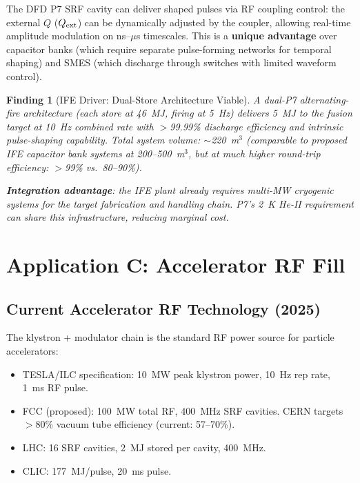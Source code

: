 \documentclass[11pt]{article}
\newtheorem{finding}{Finding}
\begin{document}
The DFD P7 SRF cavity can deliver shaped pulses via RF coupling control:
the external $Q$ ($Q_{\rm ext}$) can be dynamically adjusted by the
coupler, allowing real-time amplitude modulation on ns--$\mu$s timescales.
This is a \textbf{unique advantage} over capacitor banks (which require
separate pulse-forming networks for temporal shaping) and SMES (which
discharge through switches with limited waveform control).

\begin{finding}[IFE Driver: Dual-Store Architecture Viable]
\label{find:IFE-dual}
A dual-P7 alternating-fire architecture (each store at 46~MJ, firing at
5~Hz) delivers 5~MJ to the fusion target at 10~Hz combined rate with
$>$99.99\% discharge efficiency and intrinsic pulse-shaping capability.
Total system volume: $\sim$220~m$^3$ (comparable to proposed IFE
capacitor bank systems at 200--500~m$^3$, but at much higher round-trip
efficiency: $>$99\% vs.\ 80--90\%).

\textbf{Integration advantage}: the IFE plant already requires
multi-MW cryogenic systems for the target fabrication and handling
chain. P7's 2~K He-II requirement can share this infrastructure,
reducing marginal cost.
\end{finding}

\section{Application C: Accelerator RF Fill}
\label{sec:accel}

\subsection{Current Accelerator RF Technology (2025)}

The klystron + modulator chain is the standard RF power source for
particle accelerators:
\begin{itemize}[nosep]
  \item TESLA/ILC specification: 10~MW peak klystron power, 10~Hz rep
    rate, 1~ms RF pulse.
  \item FCC (proposed): 100~MW total RF, 400~MHz SRF cavities. CERN
    targets $>$80\% vacuum tube efficiency (current: 57--70\%).
  \item LHC: 16 SRF cavities, 2~MJ stored per cavity, 400~MHz.
  \item CLIC: 177~MJ/pulse, 20~ms pulse.
\end{itemize}
\end{document}
